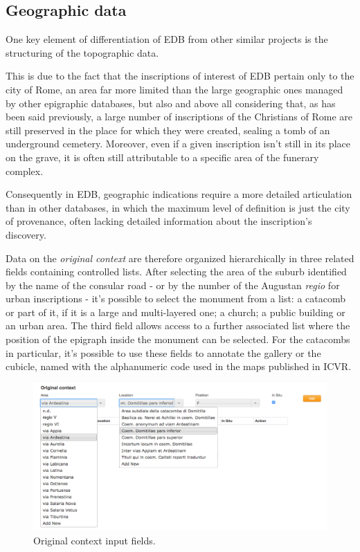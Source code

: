 \documentclass[amsthm,ebook]{saparticle}
\begin{document}
\subsection{Geographic data}


One key element of differentiation of EDB from other similar projects is the structuring of the topographic data. 

This is due to the fact that the inscriptions of interest of EDB pertain only to the city of Rome, an area far more
limited than the large geographic ones managed by other epigraphic databases, but also and above all considering that,
as has been said previously, a large number of inscriptions of the Christians of Rome are still preserved in the place
for which they were created, sealing a tomb of an underground cemetery. Moreover, even if a given inscription isn't
still in its place on the grave, it is often still attributable to a specific area of the funerary complex.

Consequently in EDB, geographic indications require a more detailed articulation than in other databases, in which the
maximum level of definition is just the city of provenance, often lacking detailed information about the inscription’s
discovery.

Data on the \emph{original context} are therefore organized hierarchically in three related fields containing controlled lists.
After selecting the area of the suburb identified by the name of the consular road - or by the number of the Augustan
\emph{regio} for urban inscriptions - it's possible to select the monument from a list: a catacomb or part of it, if it is a
large and multi-layered one; a church; a public building or an urban area. The third field allows access to a further
associated list where the position of the epigraph inside the monument can be selected. For the catacombs in
particular, it’s possible to use these fields to annotate the gallery or the cubicle, named with the alphanumeric code
used in the maps published in ICVR.

\begin{figure}[hbp]
\centering
 \includegraphics[width=\columnwidth]{EAGLE2016Roccoengrev-img005.jpg} 
\caption{Original context input fields.}
\label{fig:5}
\end{figure}
\end{document}
